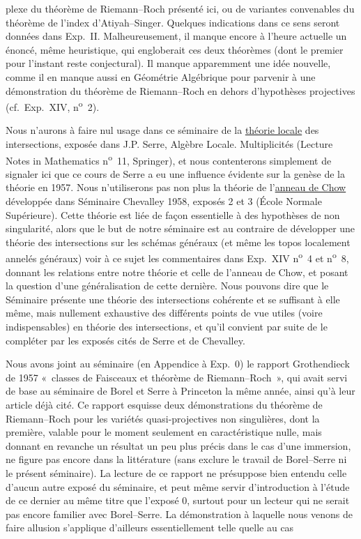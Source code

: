 plexe du théorème de Riemann--Roch présenté ici, ou de variantes convenables du théorème de l'index d'Atiyah--Singer. Quelques indications dans ce sens seront données dans Exp.\ II. Malheureusement, il manque encore à l'heure actuelle un énoncé, même heuristique, qui engloberait ces deux théorèmes (dont le premier pour l'instant reste conjectural). Il manque apparemment une idée nouvelle, comme il en manque aussi en Géométrie Algébrique pour parvenir à une démonstration du théorème de Riemann--Roch en dehors d'hypothèses projectives (cf.\ Exp.\ XIV, n\textsuperscript{o}~2).

Nous n'aurons à faire nul usage dans ce séminaire de la \underline{théorie locale} des intersections, exposée dans J.P. Serre, Algèbre Locale. Multiplicités (Lecture Notes in Mathematics n\textsuperscript{o}~11, Springer), et nous contenterons simplement de signaler ici que ce cours de Serre a eu une influence évidente sur la genèse de la théorie en 1957. Nous n'utiliserons pas non plus la théorie de l'\underline{anneau de Chow} développée dans Séminaire Chevalley 1958, exposés 2 et 3 (École Normale Supérieure). Cette théorie est liée de façon essentielle à des hypothèses de non singularité, alors que le but de notre séminaire est au contraire de développer une théorie des intersections sur les schémas généraux (et même les topos localement annelés généraux) voir à ce sujet les commentaires dans Exp.\ XIV n\textsuperscript{o}~4 et n\textsuperscript{o}~8, donnant les relations entre notre théorie et celle de l'anneau de Chow, et posant la question d'une généralisation de cette dernière. Nous pouvons dire que le Séminaire présente une théorie des intersections cohérente et se suffisant à elle même, mais nullement exhaustive des différents points de vue utiles (voire indispensables) en théorie des intersections, et qu'il convient par suite de le compléter par les exposés cités de Serre et de Chevalley.

Nous avons joint au séminaire (en Appendice à Exp.\ 0) le rapport Grothendieck de 1957 «~classes de Faisceaux et théorème de Riemann--Roch~», qui avait servi de base au séminaire de Borel et Serre à Princeton la même année, ainsi qu'à leur article déjà cité. Ce rapport esquisse deux démonstrations du théorème de Riemann--Roch pour les variétés quasi-projectives non singulières, dont la première, valable pour le moment seulement en caractéristique nulle, mais donnant en revanche un résultat un peu plus précis dans le cas d'une immersion, ne figure pas encore dans la littérature (sans exclure le travail de Borel--Serre ni le présent séminaire). La lecture de ce rapport ne présuppose bien entendu celle d'aucun autre exposé du séminaire, et peut même servir d'introduction à l'étude de ce dernier au même titre que l'exposé 0, surtout pour un lecteur qui ne serait pas encore familier avec Borel--Serre. La démonstration à laquelle nous venons de faire allusion s'applique d'ailleurs essentiellement telle quelle au cas 
